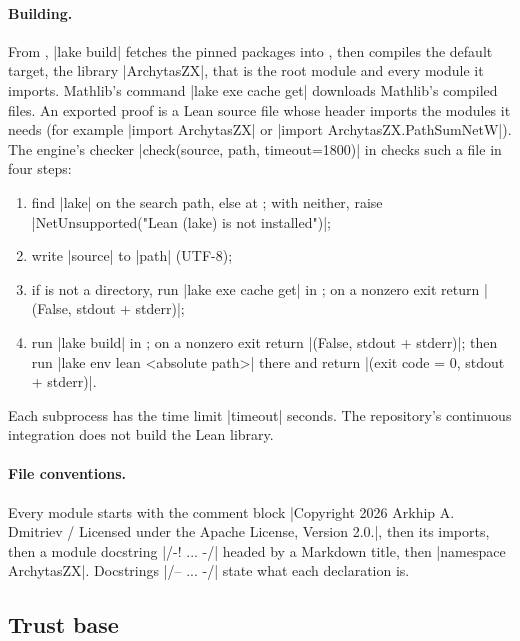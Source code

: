 \paragraph{Building.} From , \code|lake build| fetches the pinned packages
into , then compiles the default target, the library \code|ArchytasZX|, that is
the root module and every module it imports. Mathlib's command \code|lake exe cache get|
downloads Mathlib's compiled files. An exported proof is a Lean source file whose header imports
the modules it needs (for example \lean|import ArchytasZX| or \lean|import ArchytasZX.PathSumNetW|).
The engine's checker \py|check(source, path, timeout=1800)| in
 checks such a file in four steps:
\begin{enumerate}
\item find \code|lake| on the search path, else at ; with neither, raise
  \py|NetUnsupported("Lean (lake) is not installed")|;
\item write \py|source| to \py|path| (UTF-8);
\item if  is not a directory, run
  \code|lake exe cache get| in ; on a nonzero exit return
  \py|(False, stdout + stderr)|;
\item run \code|lake build| in ; on a nonzero exit return
  \py|(False, stdout + stderr)|; then run \code|lake env lean <absolute path>| there and return
  \py|(exit code = 0, stdout + stderr)|.
\end{enumerate}
Each subprocess has the time limit \py|timeout| seconds. The repository's continuous integration
does not build the Lean library.

\paragraph{File conventions.} Every module starts with the comment block
\code|Copyright 2026 Arkhip A. Dmitriev / Licensed under the Apache License, Version 2.0.|, then its
imports, then a module docstring \code|/-! ... -/| headed by a Markdown title, then
\lean|namespace ArchytasZX|. Docstrings \code|/-- ... -/| state what each declaration is.

\subsection{Trust base}\label{sec:lean-core-trust}

